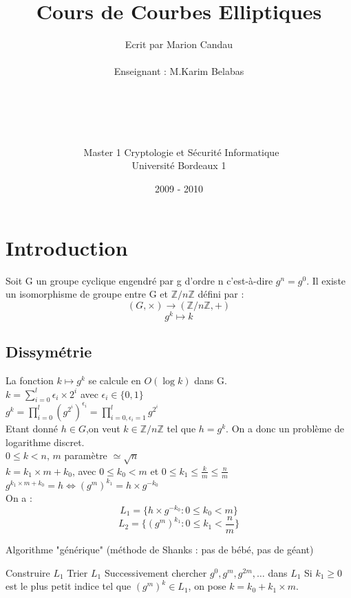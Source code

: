 \documentclass[12pt,a4paper]{report}
\title{\Huge{Cours de Courbes Elliptiques}}
\author{Ecrit par Marion Candau \\\\
Enseignant : M.Karim Belabas\\\\\\\\\\\\\
Master 1 Cryptologie et Sécurité Informatique\\
Université Bordeaux 1}
\date{2009 - 2010}
\begin{document}
\maketitle
\tableofcontents
\newpage 

\chapter{Introduction}
Soit G un groupe cyclique engendré par g d'ordre n c'est-à-dire $g^n=g^0$.
Il existe un isomorphisme de groupe entre G et $\mathbb{Z}/n\mathbb{Z}$ défini par :
$$ (G,\times) \longrightarrow (\mathbb{Z}/n\mathbb{Z},+) $$
$$ g^k \longmapsto k $$
\section{Dissymétrie}
La fonction $ k \longmapsto g^k $ se calcule en $ O(\log k) $ dans G.\\
$ \displaystyle k=\sum_{i=0}^{l} \epsilon_i \times 2^i $  avec $\epsilon_i \in \{0,1\}$\\
$\displaystyle g^k=\prod_{i=0}^{l} \left(g^{2^i}\right)^{\epsilon_i} = \prod_{i=0,\epsilon_i=1}^{l} g^{2^i} $\\
Etant donné $h \in G$,on veut $k \in \mathbb{Z}/n\mathbb{Z} $ tel que $ h = g^k $. On a donc un problème de logarithme discret.\\

$ 0 \leqslant k < n $, $m$ paramètre $\simeq \sqrt{n} $\\
$k=k_1\times m + k_0$, avec $0 \leqslant k_0 < m $ et $ 0 \leqslant k_1 \leqslant \frac{k}{m} \leqslant \frac{n}{m} $\\
$g^{k_1 \times m + k_0} = h \Longleftrightarrow (g^m)^{k_1} = h \times g^{-k_0}  $\\
On a :\\
$$ L_1=\{h\times g^{-k_0}:0 \leqslant k_0 < m\} $$
$$ L_2 = \{ (g^m)^{k_1} : 0 \leqslant k_1 < \frac{n}{m} \} $$
\begin{algorithm}
\caption{Algorithme "générique" (méthode de Shanks : pas de bébé, pas de géant)}
\begin{algorithmic}[1]
\STATE Construire $L_1$
\STATE Trier $L_1$
\STATE Successivement chercher $g^0, g^m, g^{2m}, \ldots $ dans $L_1$
\STATE Si $ k_1 \geqslant 0 $ est le plus petit indice tel que $(g^m)^k \in L_1$, on pose $ k=k_0 + k_1\times m $.
\end{algorithmic}
\end{algorithm}
\end{document}
